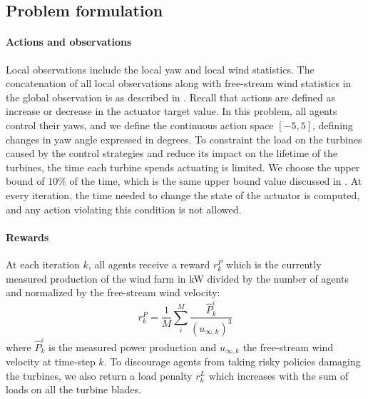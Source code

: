 \documentclass{article}
\newcommand{\jz}[1]{{\color{blue}#1}}
\newcommand{\md}[1]{{\color{red}#1}}
\begin{document}
\subsection{Problem formulation}\label{sec:bench-problem}
%
%
\paragraph{Actions and observations} Local observations include the local yaw and local wind statistics. The concatenation of all local observations along with free-stream wind statistics in the global observation is as described in .
Recall that actions are defined as increase or decrease in the actuator target value. In this problem, all agents control their yaws, and we define the continuous action space $[-5,5]$, defining changes in yaw angle expressed in degrees. To constraint the load on the turbines caused by the control strategies and reduce its impact on the lifetime of the turbines, the time each turbine spends actuating is limited. We choose the upper bound of $10\%$ of the time, which is the same upper bound value discussed in \cite{puech2022improved}. At every iteration, the time needed to change the state of the actuator is computed, and any action violating this condition is not allowed.

\paragraph{Rewards}
 At each iteration $k$, all agents receive a reward $r^P_k$ which is the currently measured production of the wind farm in kW divided by the number of agents and normalized by the free-stream wind velocity: 
%
\begin{equation}\label{eq:reward_production}
r^P_k = \frac{1}{M} \sum_i^M  \frac{\hat{P}^i_k}{(u_{\infty,k})^3} 
\end{equation}
where $\hat{P}^i_k$ is the measured power production and $u_{\infty,k}$ the free-stream wind velocity at time-step $k$.
To discourage agents from taking risky policies damaging the turbines, we also return a load penalty $r^L_k$ which increases with the sum of loads on all the turbine blades. 
\end{document}
